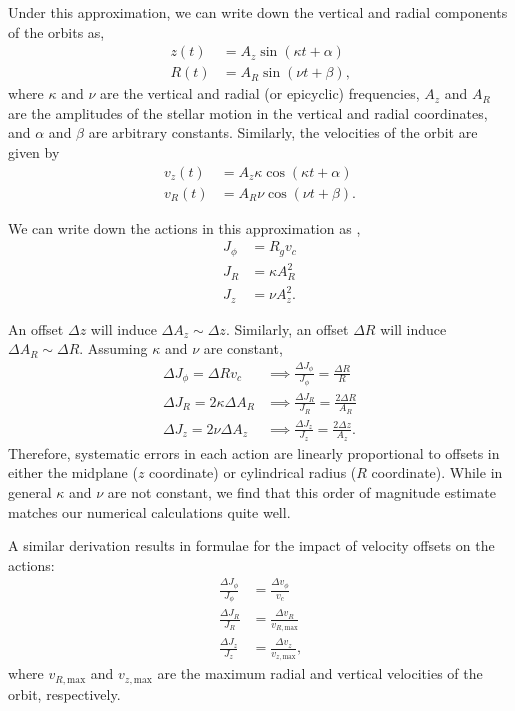 \documentclass[twocolumn]{aastex62}
\newcommand{\beq}{\begin{equation}}
\newcommand{\eeq}{\end{equation}}
\begin{document}
Under this approximation, we can write down the vertical and radial components
of the orbits as,
\beq\label{eq:orbits_epi}
\begin{split}
z(t) &= A_z \sin{(\kappa t + \alpha)}\\
R(t) &= A_R \sin{(\nu t + \beta)}\text{,}
\end{split}
\eeq
where $\kappa$ and $\nu$ are the vertical and radial (or epicyclic)
frequencies, $A_z$ and $A_R$ are the amplitudes of the stellar motion in the
vertical and radial coordinates, and $\alpha$ and $\beta$ are arbitrary
constants. Similarly, the velocities of the orbit are given by
\beq\label{eq:orbits_vel_epi}
\begin{split}
v_z(t) &= A_z \kappa \cos{(\kappa t + \alpha)}\\
v_R(t) &= A_R \nu \cos{(\nu t + \beta)}\text{.}
\end{split}
\eeq

We can write down the actions in this approximation as
\citep[][Section~3.5.3b]{2008gady.book.....B},
\beq\label{eq:actions_epi}
\begin{split}
J_{\phi} &= R_g v_c \\
J_R &= \kappa A_R^2 \\
J_z &= \nu A_z^2\text{.}
\end{split}
\eeq

An offset $\Delta z$ will induce $\Delta A_z \sim \Delta z$.
Similarly, an offset $\Delta R$ will induce $\Delta A_R \sim \Delta R$.
Assuming $\kappa$ and $\nu$ are constant, 
\beq\label{eq:actions_epi_error}
\begin{split}
\Delta J_{\phi} = \Delta R v_c &\implies \frac{\Delta J_{\phi}}{J_{\phi}} = \frac{\Delta R}{R} \\
\Delta J_R = 2 \kappa \Delta A_R &\implies \frac{\Delta J_R}{J_R} = \frac{2\Delta R}{A_R} \\
\Delta J_z = 2 \nu \Delta A_z &\implies \frac{\Delta J_z}{J_z} = \frac{2\Delta z}{A_z}\text{.}
\end{split}
\eeq
Therefore, systematic errors in each action are linearly proportional to offsets in
either the midplane ($z$ coordinate) or cylindrical radius ($R$ coordinate). While in general $\kappa$ and $\nu$ are not constant, we find that this order of magnitude estimate matches our numerical calculations quite well.


A similar derivation results in formulae for
the impact of velocity offsets on the actions:
\beq\label{eq:actions_epi_error}
\begin{split}
\frac{\Delta J_{\phi}}{J_{\phi}} &= \frac{\Delta v_{\phi}}{v_c} \\
\frac{\Delta J_R}{J_R} &= \frac{\Delta v_R}{v_{R,\text{max}}} \\
\frac{\Delta J_z}{J_z} &= \frac{\Delta v_z}{v_{z,\text{max}}}\text{,}
\end{split}
\eeq
where $v_{R,\text{max}}$ and $v_{z,\text{max}}$ are the maximum radial and
vertical velocities of the orbit, respectively.
\end{document}
